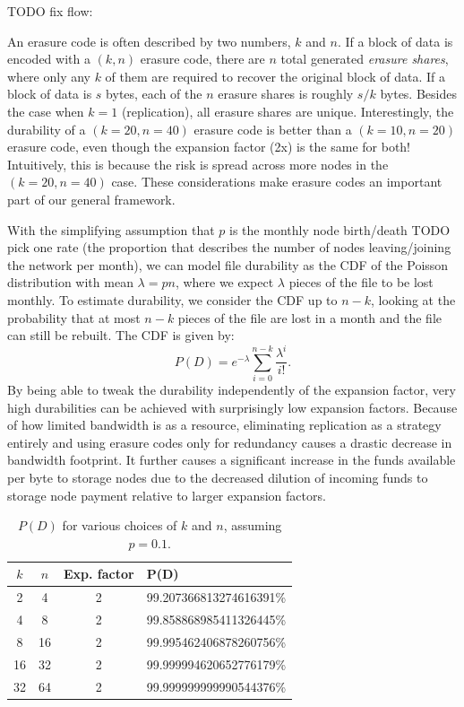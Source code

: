 \documentclass[11pt,fleqn,openany]{book}
\newcommand{\todo}[1]{{\color{red} TODO #1 }}
\begin{document}
\todo{fix flow:

An erasure code is often described by two numbers, $k$ and $n$. If a block of
data is encoded with a $(k,n)$ erasure code, there are $n$ total generated {\em
erasure shares}, where only any $k$ of them are required to recover the original
block of data. If a block of data is $s$ bytes, each of the $n$ erasure shares
is roughly $s/k$ bytes. Besides the case when $k=1$ (replication), all erasure
shares are unique. Interestingly, the durability of a $(k=20,n=40)$ erasure code
is better than a $(k=10,n=20)$ erasure code, even though the expansion factor
(2x) is the same for both! Intuitively, this is because the risk is spread
across more nodes in the $(k=20,n=40)$ case. These considerations make erasure
codes an important part of our general framework.

With the simplifying assumption that $p$ is the monthly node
birth/death \todo{pick one} rate (the proportion that describes the number of
nodes
leaving/joining the network per month), we can model file durability
as the CDF of the Poisson distribution with mean $\lambda=pn$,
where we expect $\lambda$ pieces of the file to be lost monthly. To estimate
durability, we consider the CDF up to $n-k$,
looking at the probability that at most $n-k$ pieces
of the file are lost in a month and the file can still be rebuilt.
The CDF is given by:
\begin{equation}
P(D) = e^{-\lambda} \sum_{i=0}^{n-k} \frac{\lambda^i}{i!}.
\label{eq:poiss_cdf}
\end{equation}
By being able to tweak the durability independently of the expansion factor,
very high durabilities can be achieved with surprisingly low expansion factors.
Because of how limited bandwidth is as a resource, eliminating replication as a
strategy entirely and using erasure codes only for redundancy causes a drastic
decrease in bandwidth footprint.
It further causes a significant increase in the funds available per byte to
storage nodes due to the decreased dilution of incoming funds to storage node
payment relative to larger expansion factors.

\begin{table}[h]
\centering
\begin{tabular}{c c c l}
$k$ & $n$ & Exp. factor & P(D) \\
\hline 2 & 4 & 2 & 99.207366813274616391\%\\
4 & 8 & 2 & 99.858868985411326445\%\\
8 & 16 & 2 & 99.995462406878260756\%\\
16 & 32 & 2 & 99.999994620652776179\%\\
32 & 64 & 2 & 99.999999999990544376\%\\
\end{tabular}
\caption{$P(D)$ for various choices of $k$ and $n$, assuming $p=0.1$.}
\end{table}

}
\end{document}
